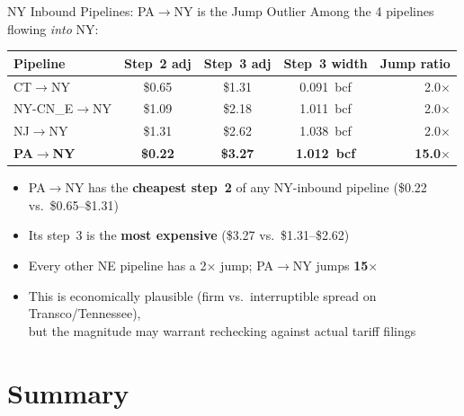 \documentclass[aspectratio=169, 11pt]{beamer}
\begin{document}
\begin{frame}{NY Inbound Pipelines: PA$\to$NY is the Jump Outlier}
  Among the 4 pipelines flowing \emph{into} NY:

  \vspace{0.3em}
  \begin{table}
    \centering
    \begin{tabular}{lcccr}
      \toprule
      \textbf{Pipeline} & \textbf{Step~2 adj} & \textbf{Step~3 adj} & \textbf{Step~3 width} & \textbf{Jump ratio} \\
      \midrule
      CT$\to$NY        & \$0.65 & \$1.31 & 0.091~bcf & 2.0$\times$ \\
      NY-CN\_E$\to$NY  & \$1.09 & \$2.18 & 1.011~bcf & 2.0$\times$ \\
      NJ$\to$NY        & \$1.31 & \$2.62 & 1.038~bcf & 2.0$\times$ \\
      \textbf{PA$\to$NY} & \textbf{\$0.22} & \alert{\textbf{\$3.27}} & \textbf{1.012~bcf} & \alert{\textbf{15.0$\times$}} \\
      \bottomrule
    \end{tabular}
  \end{table}

  \vspace{0.5em}
  \begin{itemize}
    \item PA$\to$NY has the \textbf{cheapest step~2} of any NY-inbound pipeline (\$0.22 vs.\ \$0.65--\$1.31)
    \item Its step~3 is the \textbf{most expensive} (\$3.27 vs.\ \$1.31--\$2.62) \\
    \item Every other NE pipeline has a 2$\times$ jump; PA$\to$NY jumps \textbf{15$\times$}
    \item This is economically plausible (firm vs.\ interruptible spread on Transco/Tennessee), \\
      but the magnitude may warrant rechecking against actual tariff filings
  \end{itemize}
\end{frame}


\section{Summary}
\end{document}
